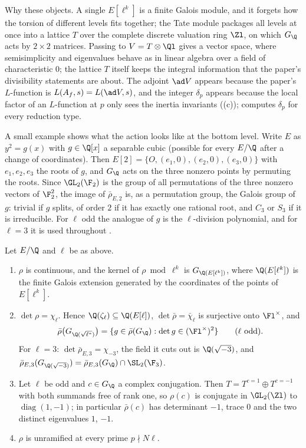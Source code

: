 Why these objects. A single $E[\ell^k]$ is a finite Galois module, and it forgets how the torsion of different levels fits together; the Tate
module packages all levels at once into a lattice $T$ over the complete discrete valuation ring $\Zl$, on which $G_\Q$ acts by $2\times2$
matrices. Passing to $V=T\otimes\Ql$ gives a vector space, where semisimplicity and eigenvalues behave as in linear algebra over a field of
characteristic $0$; the lattice $T$ itself keeps the integral information that the paper's divisibility statements are about. The adjoint
$\ad V$ appears because the paper's $L$-function is $L(A_f,s)=L(\ad V,s)$, and the integer $\delta_p$ appears because the local factor of an
$L$-function at $p$ only sees the inertia invariants ((c));  computes $\delta_p$ for every
reduction type.

A small example shows what the action looks like at the bottom level. Write $E$ as $y^2=g(x)$ with $g\in\Q[x]$ a separable cubic (possible for every
$E/\Q$ after a change of coordinates). Then $E[2]=\{O,(e_1,0),(e_2,0),(e_3,0)\}$ with $e_1,e_2,e_3$ the roots of $g$, and $G_\Q$ acts on the three
nonzero points by permuting the roots. Since $\GL_2(\F_2)$ is the group of all permutations of the three nonzero vectors of $\F_2^2$, the image of
$\bar\rho_{E,2}$ is, as a permutation group, the Galois group of $g$: trivial if $g$ splits, of order $2$ if it has exactly one rational root, and
$C_3$ or $S_3$ if it is irreducible. For $\ell$ odd the analogue of $g$ is the $\ell$-division polynomial, and for $\ell=3$ it is used throughout
.

\begin{proposition}\label{prop:galrep:rho-basic}
Let $E/\Q$ and $\ell$ be as above.
\begin{enumerate}[label=(\roman*)]
\item $\rho$ is continuous, and the kernel of $\rho\bmod\ell^k$ is $G_{\Q(E[\ell^k])}$, where $\Q(E[\ell^k])$ is the finite Galois extension generated
by the coordinates of the points of $E[\ell^k]$.
\item $\det\rho=\chi_\ell$. Hence $\Q(\zeta_\ell)\subseteq\Q(E[\ell])$, $\det\bar\rho=\bar\chi_\ell$ is surjective onto $\Fl^\times$, and
\[
\bar\rho\bigl(G_{\Q(\sqrt{\ell^*})}\bigr)=\{g\in\bar\rho(G_\Q):\det g\in(\Fl^\times)^2\}\qquad(\ell\text{ odd}).
\]
For $\ell=3$: $\det\bar\rho_{E,3}=\chi_{-3}$, the field it cuts out is $\Q(\sqrt{-3})$, and $\bar\rho_{E,3}(G_{\Q(\sqrt{-3})})=\bar\rho_{E,3}(G_\Q)\cap\SL_2(\F_3)$.
\item Let $\ell$ be odd and $c\in G_\Q$ a complex conjugation. Then $T=T^{c=1}\oplus T^{c=-1}$ with both summands free of rank one, so $\rho(c)$ is
conjugate in $\GL_2(\Zl)$ to $\operatorname{diag}(1,-1)$; in particular $\bar\rho(c)$ has determinant $-1$, trace $0$ and the two distinct
eigenvalues $1$, $-1$.
\item $\rho$ is unramified at every prime $p\nmid N\ell$.
\end{enumerate}
\end{proposition}

